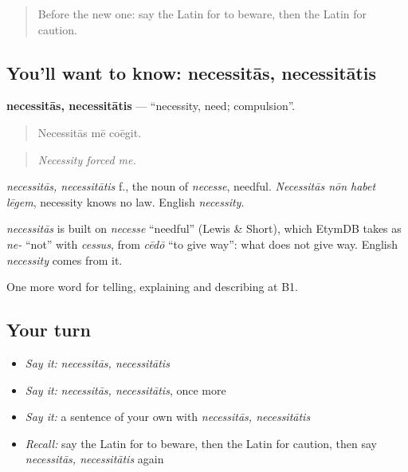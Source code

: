 \begin{quote}
Before the new one: say the Latin for to beware, then the Latin for caution.
\end{quote}

\subsection*{You'll want to know: necessitās, necessitātis}
\textbf{necessitās, necessitātis} — \textquotedblleft{}necessity, need; compulsion\textquotedblright{}.

\begin{quote}
Necessitās mē coēgit.
\end{quote}

\begin{quote}
\emph{Necessity forced me.}
\end{quote}

\emph{necessitās, necessitātis} f., the noun of \emph{necesse}, needful. \emph{Necessitās nōn habet lēgem}, necessity knows no law. English \emph{necessity}.

\begin{cousinweb}
\emph{necessitās} is built on \emph{necesse} \textquotedblleft{}needful\textquotedblright{} (Lewis \& Short), which EtymDB takes as \emph{ne-} \textquotedblleft{}not\textquotedblright{} with \emph{cessus}, from \emph{cēdō} \textquotedblleft{}to give way\textquotedblright{}: what does not give way. English \emph{necessity} comes from it.
\end{cousinweb}

\begin{grammarlens}[title={What you've built}]
One more word for telling, explaining and describing at B1.
\end{grammarlens}

\subsection*{Your turn}
\begin{itemize}
\raggedright
  \item \emph{Say it:} \emph{necessitās, necessitātis}
  \item \emph{Say it:} \emph{necessitās, necessitātis}, once more
  \item \emph{Say it:} a sentence of your own with \emph{necessitās, necessitātis}
  \item \emph{Recall:} say the Latin for to beware, then the Latin for caution, then say \emph{necessitās, necessitātis} again
\end{itemize}

